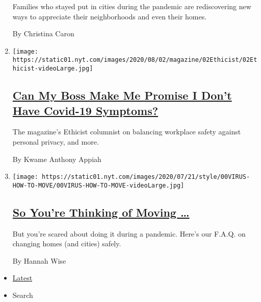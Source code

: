 \begin{enumerate}
  Families who stayed put in cities during the pandemic are
  rediscovering new ways to appreciate their neighborhoods and even
  their homes.

  By Christina Caron
\item
  \texttt{[image: https://static01.nyt.com/images/2020/08/02/magazine/02Ethicist/02Ethicist-videoLarge.jpg]}

  \hypertarget{can-my-boss-make-me-promise-i-dont-have-covid-19-symptoms}{%
  \subsection{\texorpdfstring{\href{/2020/07/28/magazine/can-my-boss-make-me-promise-i-dont-have-covid-19-symptoms.html}{Can
  My Boss Make Me Promise I Don't Have Covid-19
  Symptoms?}}{Can My Boss Make Me Promise I Don't Have Covid-19 Symptoms?}}\label{can-my-boss-make-me-promise-i-dont-have-covid-19-symptoms}}

  The magazine's Ethicist columnist on balancing workplace safety
  against personal privacy, and more.

  By Kwame Anthony Appiah
\item
  \texttt{[image: https://static01.nyt.com/images/2020/07/21/style/00VIRUS-HOW-TO-MOVE/00VIRUS-HOW-TO-MOVE-videoLarge.jpg]}

  \hypertarget{so-youre-thinking-of-moving-}{%
  \subsection{\texorpdfstring{\href{/2020/07/24/style/moving-during-covid-coronavirus.html}{So
  You're Thinking of Moving
  \ldots{}}}{So You're Thinking of Moving \ldots{}}}\label{so-youre-thinking-of-moving-}}

  But you're scared about doing it during a pandemic. Here's our F.A.Q.
  on changing homes (and cities) safely.

  By Hannah Wise
\end{enumerate}

\begin{itemize}
\tightlist
\item
  \protect\hyperlink{stream-panel}{Latest}
\item
  Search
\end{itemize}


